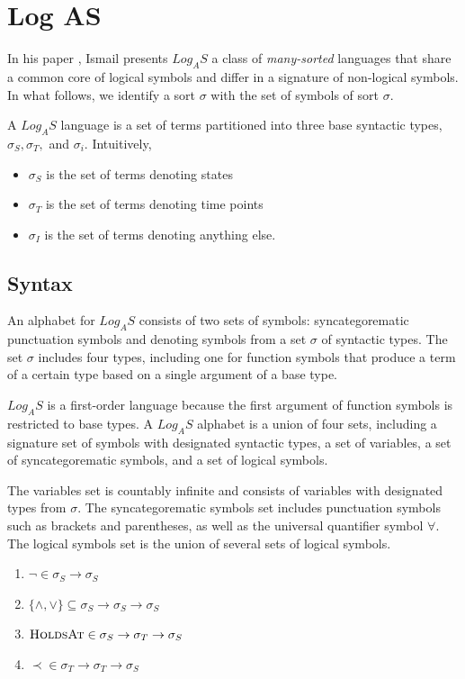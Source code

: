 \chapter{Log AS}

In his paper \cite{ismail2013stability}, Ismail presents
$Log_AS$ a class of \textit{many-sorted} languages that share a common core of logical symbols and differ in a signature of non-logical symbols. In what follows, we identify a sort $\sigma$ with
the set of symbols of sort $\sigma$.

A $Log_AS$ language is a set of terms partitioned into three base syntactic types, $\sigma_S , \sigma_T ,$
and $\sigma_i$. Intuitively,
\begin{itemize}
  \item $\sigma_S$ is the set of terms denoting states
  \item $\sigma_T$ is the set of terms denoting time points
  \item $\sigma_I$ is the set of terms denoting anything else.
\end{itemize}

\section{Syntax}

An alphabet for $Log_A S$ consists of two sets of symbols: syncategorematic punctuation symbols and denoting symbols from a set $\sigma$ of syntactic types. The set $\sigma$ includes four types, including one for function symbols that produce a term of a certain type based on a single argument of a base type.

$Log_A S$ is a first-order language because the first argument of function symbols is restricted to base types. A $Log_A S$ alphabet is a union of four sets, including a signature set of symbols with designated syntactic types, a set of variables, a set of syncategorematic symbols, and a set of logical symbols.

The variables set is countably infinite and consists of variables with designated types from $\sigma$. The syncategorematic symbols set includes punctuation symbols such as brackets and parentheses, as well as the universal quantifier symbol $\forall$. The logical symbols set is the union of several sets of logical symbols.

\begin{enumerate}
  \item $\neg \in \sigma_S \to \sigma_S$
  \item $\{\land, \lor \} \subseteq \sigma_S \to \sigma_S \to \sigma_S$
  \item $\textsc{HoldsAt} \in \sigma_S \to \sigma_T \to \sigma_S$
  \item $\prec \in \sigma_T \to \sigma_T \to \sigma_S$
\end{enumerate}


